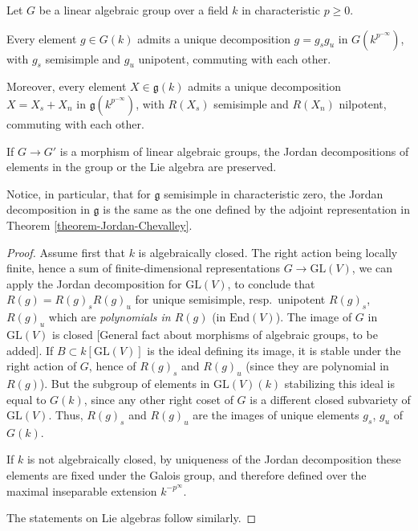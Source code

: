 \begin{theorem}
\label{theorem-Jordan-group}
 Let $G$ be a linear algebraic group over a field $k$ in characteristic $p\ge 0$. 
 
 Every element $g\in G(k)$ admits a unique decomposition $g = g_s g_u$ in $G(k^{p^{-\infty}})$, with $g_s$ semisimple and $g_u$ unipotent, commuting with each other.
 
 Moreover, every element $X\in \mathfrak g(k)$ admits a unique decomposition $X = X_s + X_n$ in $\mathfrak g(k^{p^{-\infty}})$, with $R(X_s)$ semisimple and $R(X_n)$ nilpotent, commuting with each other.
 
 If $G\to G'$ is a morphism of linear algebraic groups, the Jordan decompositions of elements in the group or the Lie algebra are preserved.
\end{theorem}

Notice, in particular, that for $\mathfrak g$ semisimple in characteristic zero, the Jordan decomposition in $\mathfrak g$ is the same as the one defined by the adjoint representation in Theorem \ref{theorem-Jordan-Chevalley}.

\begin{proof}
 Assume first that $k$ is algebraically closed. The right action being locally finite, hence a sum of finite-dimensional representations $G\to \text{GL}(V)$, we can apply the Jordan decomposition for $\text{GL}(V)$, to conclude that $R(g) = R(g)_s R(g)_u$ for unique semisimple, resp.\ unipotent $R(g)_s$, $R(g)_u$ which are \emph{polynomials in $R(g)$} (in $\text{End}(V)$). The image of $G$ in $\text{GL}(V)$ is closed [General fact about morphisms of algebraic groups, to be added]. If $B\subset k[\text{GL}(V)]$ is the ideal defining its image, it is stable under the right action of $G$, hence of $R(g)_s$ and $R(g)_u$ (since they are polynomial in $R(g)$). But the subgroup of elements in $\text{GL}(V)(k)$ stabilizing this ideal is equal to $G(k)$, since any other right coset of $G$ is a different closed subvariety of $\text{GL}(V)$. Thus, $R(g)_s$ and $R(g)_u$ are the images of unique elements $g_s$, $g_u$ of $G(k)$.
 
 If $k$ is not algebraically closed, by uniqueness of the Jordan decomposition these elements are fixed under the Galois group, and therefore defined over the maximal inseparable extension $k^{-p^\infty}$.   
 
 The statements on Lie algebras follow similarly. 
\end{proof}


